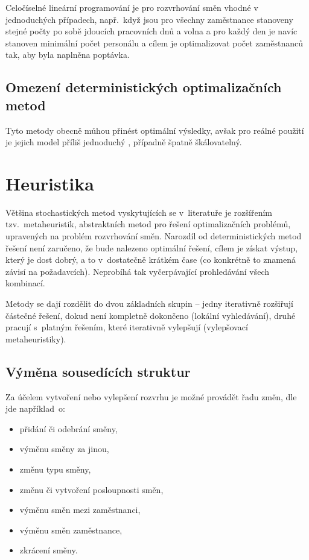 \documentclass[twoside]{ctuthesis}
\begin{document}
Celočíselné lineární programování je pro rozvrhování směn vhodné v jed\-no\-du\-chých případech, např.~když jsou pro všechny zaměstnance stanoveny stejné počty po sobě jdoucích pracovních dnů a volna a pro každý den je navíc stanoven minimální počet personálu a cílem je optimalizovat počet zaměstnanců tak, aby byla naplněna poptávka. \cite{satheeshkumar2014linear}

\subsection{Omezení deterministických optimalizačních metod}
Tyto metody obecně můhou přinést optimální výsledky, avšak pro reálné použití je jejich model příliš jednoduchý \cite{burke2004state}, případně špatně škálovatelný.

\section{Heuristika}

Většina stochastických metod vyskytujících se v~literatuře je rozšířením tzv.~metaheuristik, abstraktních metod pro řešení optimalizačních problémů, upravených na problém rozvrhování směn. Narozdíl od deterministických metod řešení není zaručeno, že bude nalezeno optimální řešení, cílem je získat výstup, který je dost dobrý, a to v~dostatečně krátkém čase (co konkrétně to znamená závisí na požadavcích). Neprobíhá tak vyčerpávající prohledávání všech kombinací. \cite{glover2015metaheuristics}

Metody se dají rozdělit do dvou základních skupin -- jedny iterativně rozšiřují částečné řešení, dokud není kompletně dokončeno (lokální vyhledávání), druhé pracují s~platným řešením, které iterativně vylepšují (vylepšovací metaheuristiky). \cite{van2013personnel}

\subsection{Výměna sousedících struktur}
Za účelem vytvoření nebo vylepšení rozvrhu je možné provádět řadu změn, dle \cite{kletzander2020solving} jde například~o:
\begin{itemize}
	\item přidání či odebrání směny,
	\item výměnu směny za jinou,
	\item změnu typu směny,
	\item změnu či vytvoření posloupnosti směn,
	\item výměnu směn mezi zaměstnanci,
	\item výměnu směn zaměstnance,
	\item zkrácení směny.
\end{itemize}
\end{document}

